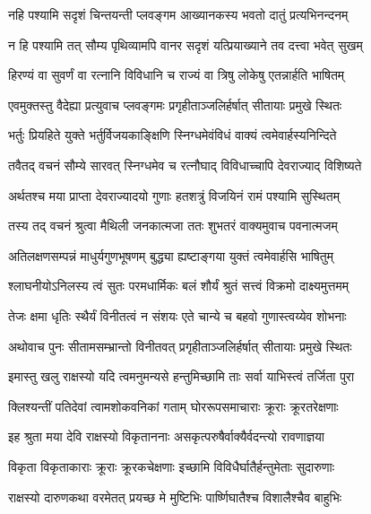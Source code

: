 \twolineshloka
{नहि पश्यामि सदृशं चिन्तयन्ती प्लवङ्गम}
{आख्यानकस्य भवतो दातुं प्रत्यभिनन्दनम्} %

\twolineshloka
{न हि पश्यामि तत् सौम्य पृथिव्यामपि वानर}
{सदृशं यत्प्रियाख्याने तव दत्त्वा भवेत् सुखम्} %

\twolineshloka
{हिरण्यं वा सुवर्णं वा रत्नानि विविधानि च}
{राज्यं वा त्रिषु लोकेषु एतन्नार्हति भाषितम्} %

\twolineshloka
{एवमुक्तस्तु वैदेह्या प्रत्युवाच प्लवङ्गमः}
{प्रगृहीताञ्जलिर्हर्षात् सीतायाः प्रमुखे स्थितः} %

\twolineshloka
{भर्तुः प्रियहिते युक्ते भर्तुर्विजयकाङ्क्षिणि}
{स्निग्धमेवंविधं वाक्यं त्वमेवार्हस्यनिन्दिते} %

\twolineshloka
{तवैतद् वचनं सौम्ये सारवत् स्निग्धमेव च}
{रत्नौघाद् विविधाच्चापि देवराज्याद् विशिष्यते} %

\twolineshloka
{अर्थतश्च मया प्राप्ता देवराज्यादयो गुणाः}
{हतशत्रुं विजयिनं रामं पश्यामि सुस्थितम्} %

\twolineshloka
{तस्य तद् वचनं श्रुत्वा मैथिली जनकात्मजा}
{ततः शुभतरं वाक्यमुवाच पवनात्मजम्} %

\twolineshloka
{अतिलक्षणसम्पन्नं माधुर्यगुणभूषणम्}
{बुद्ध्या ह्यष्टाङ्गया युक्तं त्वमेवार्हसि भाषितुम्} %

\twolineshloka
{श्लाघनीयोऽनिलस्य त्वं सुतः परमधार्मिकः}
{बलं शौर्यं श्रुतं सत्त्वं विक्रमो दाक्ष्यमुत्तमम्} %

\twolineshloka
{तेजः क्षमा धृतिः स्थैर्यं विनीतत्वं न संशयः}
{एते चान्ये च बहवो गुणास्त्वय्येव शोभनाः} %

\twolineshloka
{अथोवाच पुनः सीतामसम्भ्रान्तो विनीतवत्}
{प्रगृहीताञ्जलिर्हर्षात् सीतायाः प्रमुखे स्थितः} %

\twolineshloka
{इमास्तु खलु राक्षस्यो यदि त्वमनुमन्यसे}
{हन्तुमिच्छामि ताः सर्वा याभिस्त्वं तर्जिता पुरा} %

\twolineshloka
{क्लिश्यन्तीं पतिदेवां त्वामशोकवनिकां गताम्}
{घोररूपसमाचाराः क्रूराः क्रूरतरेक्षणाः} %

\twolineshloka
{इह श्रुता मया देवि राक्षस्यो विकृताननाः}
{असकृत्परुषैर्वाक्यैर्वदन्त्यो रावणाज्ञया} %

\twolineshloka
{विकृता विकृताकाराः क्रूराः क्रूरकचेक्षणाः}
{इच्छामि विविधैर्घातैर्हन्तुमेताः सुदारुणाः} %

\twolineshloka
{राक्षस्यो दारुणकथा वरमेतत् प्रयच्छ मे}
{मुष्टिभिः पार्ष्णिघातैश्च विशालैश्चैव बाहुभिः} %

